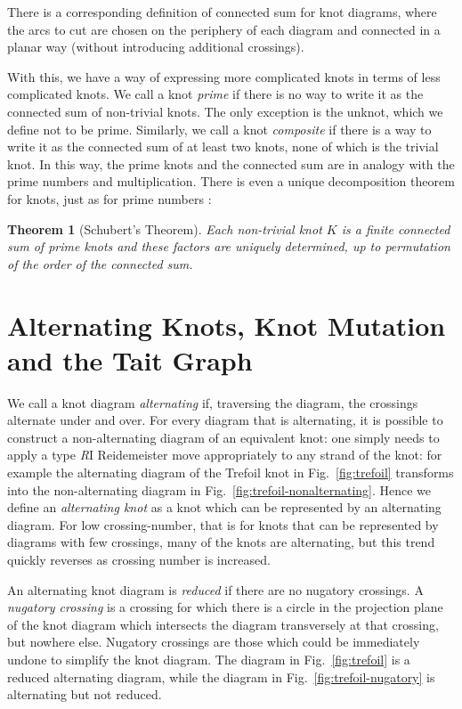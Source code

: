 \documentclass[12pt]{report}
\newtheorem*{theorem}{Theorem}
\theoremstyle{upright}
\begin{document}
There is a corresponding definition of connected sum for knot diagrams, where the arcs to cut are chosen on the periphery of each diagram and connected in a planar way (without introducing additional crossings).

With this, we have a way of expressing more complicated knots in terms of less complicated knots. We call a knot \textit{prime} if there is no way to write it as the connected sum of non-trivial knots. The only exception is the unknot, which we define not to be prime.  Similarly, we call a knot \textit{composite} if there is a way to write it as the connected sum of at least two knots, none of which is the trivial knot. In this way, the prime knots and the connected sum are in analogy with the prime numbers and multiplication. There is even a unique decomposition theorem for knots, just as for prime numbers \cite[Thoerem 7.12]{knots}:

\begin{theorem}[Schubert's Theorem]
	Each non-trivial knot $K$ is a finite connected sum of prime knots and these factors are uniquely determined, up to permutation of the order of the connected sum. 
\end{theorem}

\section{Alternating Knots, Knot Mutation and the Tait Graph}
We call a knot diagram \textit{alternating} if, traversing the diagram, the crossings alternate under and over. For every diagram that is alternating, it is possible to construct a non-alternating diagram of an equivalent knot: one simply needs to apply a type \textit{R}I Reidemeister move appropriately to any strand of the knot: for example the alternating diagram of the Trefoil knot in Fig.~\ref{fig:trefoil} transforms into the non-alternating diagram in Fig.~\ref{fig:trefoil-nonalternating}. Hence we define an \textit{alternating knot} as a knot which can be represented by an alternating diagram. For low crossing-number, that is for knots that can be represented by diagrams with few crossings, many of the knots are alternating, but this trend quickly reverses as crossing number is increased.

An alternating knot diagram is \textit{reduced} if there are no nugatory crossings. A \textit{nugatory crossing} is a crossing for which there is a circle in the projection plane of the knot diagram which intersects the diagram transversely at that crossing, but nowhere else. Nugatory crossings are those which could be immediately undone to simplify the knot diagram. The diagram in Fig.~\ref{fig:trefoil} is a reduced alternating diagram, while the diagram in Fig.~\ref{fig:trefoil-nugatory} is alternating but not reduced.
\end{document}
